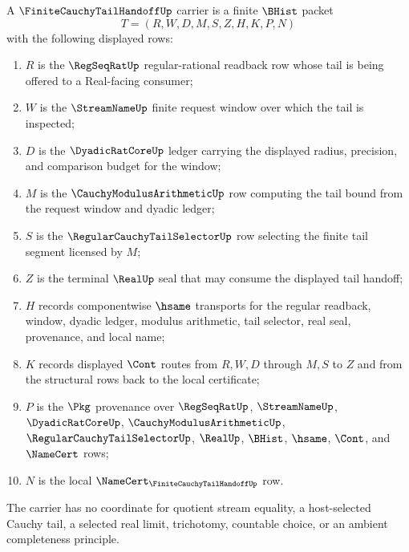 \begin{definition}
\label{def:finite-cauchy-tail-handoff-carrier}
A $\FiniteCauchyTailHandoffUp$ carrier is a finite $\BHist$ packet
$$
T=(R,W,D,M,S,Z,H,K,P,N)
$$
with the following displayed rows:
\begin{enumerate}
\item $R$ is the $\RegSeqRatUp$ regular-rational readback row whose tail is being offered to a Real-facing consumer;
\item $W$ is the $\StreamNameUp$ finite request window over which the tail is inspected;
\item $D$ is the $\DyadicRatCoreUp$ ledger carrying the displayed radius, precision, and comparison budget for the window;
\item $M$ is the $\CauchyModulusArithmeticUp$ row computing the tail bound from the request window and dyadic ledger;
\item $S$ is the $\RegularCauchyTailSelectorUp$ row selecting the finite tail segment licensed by $M$;
\item $Z$ is the terminal $\RealUp$ seal that may consume the displayed tail handoff;
\item $H$ records componentwise $\hsame$ transports for the regular readback, window, dyadic ledger, modulus arithmetic, tail selector, real seal, provenance, and local name;
\item $K$ records displayed $\Cont$ routes from $R,W,D$ through $M,S$ to $Z$ and from the structural rows back to the local certificate;
\item $P$ is the $\Pkg$ provenance over $\RegSeqRatUp$, $\StreamNameUp$, $\DyadicRatCoreUp$, $\CauchyModulusArithmeticUp$, $\RegularCauchyTailSelectorUp$, $\RealUp$, $\BHist$, $\hsame$, $\Cont$, and $\NameCert$ rows;
\item $N$ is the local $\NameCert_{\FiniteCauchyTailHandoffUp}$ row.
\end{enumerate}
The carrier has no coordinate for quotient stream equality, a host-selected Cauchy tail, a selected real limit, trichotomy, countable choice, or an ambient completeness principle.
\end{definition}


